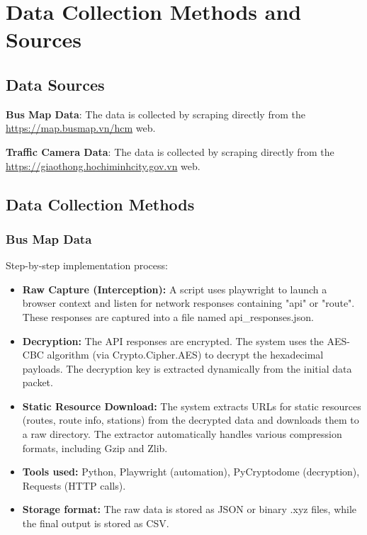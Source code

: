 \chapter{Data Collection Methods and Sources}


\section{Data Sources}
\textbf{Bus Map Data}: The data is collected by scraping directly from the \url{https://map.busmap.vn/hcm} web.


\textbf{Traffic Camera Data}: The data is collected by scraping directly from the \url{https://giaothong.hochiminhcity.gov.vn} web.

\section{Data Collection Methods}
\subsection{Bus Map Data}
Step-by-step implementation process:
\begin{itemize}
\item \textbf{Raw Capture (Interception):} A script uses playwright to launch a browser context and listen for network responses containing "api" or "route". These responses are captured into a file named api\_responses.json.
\item \textbf{Decryption:} The API responses are encrypted. The system uses the AES-CBC algorithm (via Crypto.Cipher.AES) to decrypt the hexadecimal payloads. The decryption key is extracted dynamically from the initial data packet.
\item \textbf{Static Resource Download:} The system extracts URLs for static resources (routes, route info, stations) from the decrypted data and downloads them to a raw directory. The extractor automatically handles various compression formats, including Gzip and Zlib.
\item \textbf{Tools used:} Python, Playwright (automation), PyCryptodome (decryption), Requests (HTTP calls).
\item \textbf{Storage format:} The raw data is stored as JSON or binary .xyz files, while the final output is stored as CSV.
\end{itemize}

